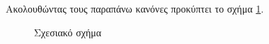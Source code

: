 \documentclass{assignment}
\begin{document}
Ακολουθώντας τους παραπάνω κανόνες προκύπτει το σχήμα \ref{fig:RelationalModel:diagram}.

\begin{landscape}
\begin{figure}
\begin{center}
\caption{Σχεσιακό σχήμα}
\label{fig:RelationalModel:diagram}
\end{center}
\end{figure}
\end{landscape}
\end{document}
